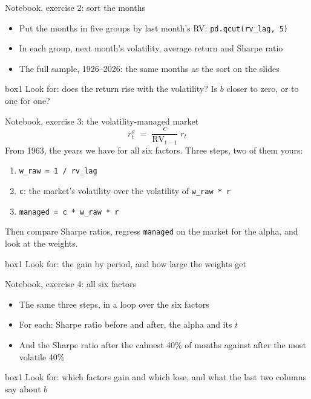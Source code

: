 \documentclass[aspectratio=169,10pt]{beamer}
\begin{document}
\begin{frame}{Notebook, exercise 2: sort the months}
\vskip 4pt
\begin{itemize}
\item Put the months in five groups by last month's RV: \texttt{pd.qcut(rv\_lag, 5)}
\vskip 6pt
\item In each group, next month's volatility, average return and Sharpe ratio
\vskip 6pt
\item The full sample, 1926--2026: the same months as the sort on the slides
\end{itemize}
\vskip 14pt
\begin{beamercolorbox}[rounded=true,sep=7pt,center]{box1}
Look for: does the return rise with the volatility? Is $b$ closer to zero, or to one for one?
\end{beamercolorbox}
\end{frame}

\begin{frame}{Notebook, exercise 3: the volatility-managed market}
\[ r^{\sigma}_{t} \;=\; \frac{c}{\text{RV}_{t-1}}\; r_{t} \]
\vskip 2pt
From 1963, the years we have for all six factors. Three steps, two of them yours:
\vskip 6pt
\begin{enumerate}
\item \texttt{w\_raw = 1 / rv\_lag}
\vskip 4pt
\item \texttt{c}: the market's volatility over the volatility of \texttt{w\_raw * r}
\vskip 4pt
\item \texttt{managed = c * w\_raw * r}
\end{enumerate}
\vskip 6pt
Then compare Sharpe ratios, regress \texttt{managed} on the market for the alpha, and look at the weights.
\vskip 10pt
\begin{beamercolorbox}[rounded=true,sep=7pt,center]{box1}
Look for: the gain by period, and how large the weights get
\end{beamercolorbox}
\end{frame}

\begin{frame}{Notebook, exercise 4: all six factors}
\vskip 4pt
\begin{itemize}
\item The same three steps, in a loop over the six factors
\vskip 6pt
\item For each: Sharpe ratio before and after, the alpha and its $t$
\vskip 6pt
\item And the Sharpe ratio after the calmest 40\% of months against after the most volatile 40\%
\end{itemize}
\vskip 14pt
\begin{beamercolorbox}[rounded=true,sep=7pt,center]{box1}
Look for: which factors gain and which lose, and what the last two columns say about $b$
\end{beamercolorbox}
\end{frame}
\end{document}
